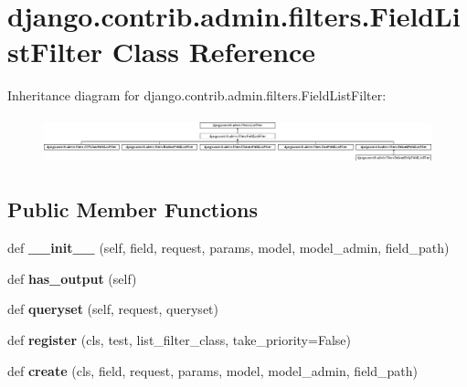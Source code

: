 \hypertarget{classdjango_1_1contrib_1_1admin_1_1filters_1_1_field_list_filter}{}\section{django.\+contrib.\+admin.\+filters.\+Field\+List\+Filter Class Reference}
\label{classdjango_1_1contrib_1_1admin_1_1filters_1_1_field_list_filter}
Inheritance diagram for django.\+contrib.\+admin.\+filters.\+Field\+List\+Filter\+:\begin{figure}[H]
\begin{center}
\leavevmode
\includegraphics[height=1.391304cm]{classdjango_1_1contrib_1_1admin_1_1filters_1_1_field_list_filter}
\end{center}
\end{figure}
\subsection*{Public Member Functions}
\begin{DoxyCompactItemize}
\item 
\mbox{\label{classdjango_1_1contrib_1_1admin_1_1filters_1_1_field_list_filter_a3b3f181da6dcf6b7a3fd67dd297d988e}} 
def {\bfseries \+\_\+\+\_\+init\+\_\+\+\_\+} (self, field, request, params, model, model\+\_\+admin, field\+\_\+path)
\item 
\mbox{\label{classdjango_1_1contrib_1_1admin_1_1filters_1_1_field_list_filter_aa00b82cc9f26a8bbe490cd5f377ea523}} 
def {\bfseries has\+\_\+output} (self)
\item 
\mbox{\label{classdjango_1_1contrib_1_1admin_1_1filters_1_1_field_list_filter_a51704150dec2abf76f7d4dc23dcc64ab}} 
def {\bfseries queryset} (self, request, queryset)
\item 
\mbox{\label{classdjango_1_1contrib_1_1admin_1_1filters_1_1_field_list_filter_ae37811b4fbd2a6739258d7f86b597e64}} 
def {\bfseries register} (cls, test, list\+\_\+filter\+\_\+class, take\+\_\+priority=False)
\item 
\mbox{\label{classdjango_1_1contrib_1_1admin_1_1filters_1_1_field_list_filter_ae83f4fd0e217eac7fce541a6a172e3cb}} 
def {\bfseries create} (cls, field, request, params, model, model\+\_\+admin, field\+\_\+path)
\end{DoxyCompactItemize}
